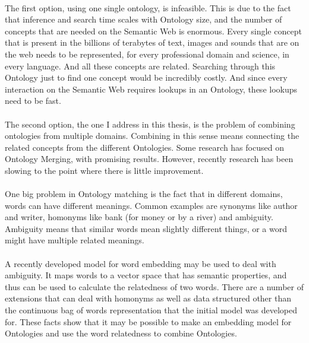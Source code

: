 \documentclass{article}
\begin{document}
 \paragraph{}
 The first option, using one single ontology, is infeasible. This is due to the fact that inference and search time scales with Ontology size\cite{complexity},
 and the number of concepts that are needed on the Semantic Web is enormous. Every single concept that is present in the billions of terabytes of text, images and sounds that are on the web needs to be represented, for every professional domain and science, in every language. And all these concepts are related. Searching through this Ontology just to find one concept would be incredibly costly. And since every interaction on the Semantic Web requires lookups in an Ontology, these lookups need to be fast.
 \paragraph{}
 The second option, the one I address in this thesis, is the problem of combining ontologies from multiple domains. Combining in this sense means connecting the related concepts from the different Ontologies. Some research has focused on Ontology Merging, with promising results. However, recently research has been slowing to the point where there is little improvement.
 \paragraph{}
 One big problem in Ontology matching is the fact that in different domains, words can have different meanings. Common examples are synonyms like author and writer, homonyms like bank (for money or by a river) and ambiguity. Ambiguity means that similar words mean slightly different things, or a word might have multiple related meanings.
 \paragraph{}
 A recently developed model for word embedding may be used to deal with ambiguity. It maps words to a vector space that has semantic properties, and thus can be used to calculate the relatedness of two words. There are a number of extensions that can deal with homonyms as well as data structured other than the continuous bag of words representation that the initial model was developed for. These facts show that it may be possible to make an embedding model for Ontologies and use the word relatedness to combine Ontologies\cite{multisense}.
\end{document}
